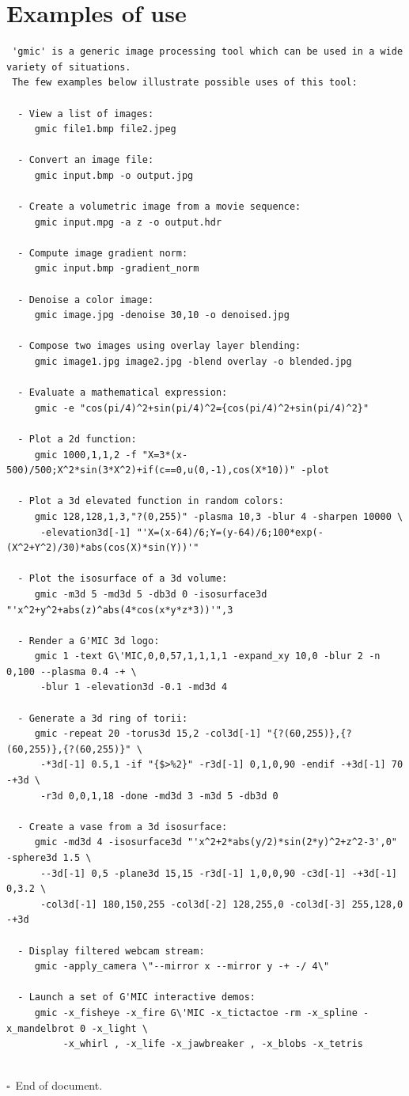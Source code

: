 \documentclass[a4paper,11pt,twoside]{book}
\begin{document}
\section{Examples of use}
\small
\begin{lstlisting}
 'gmic' is a generic image processing tool which can be used in a wide variety of situations. 
 The few examples below illustrate possible uses of this tool: 
 
  - View a list of images: 
     gmic file1.bmp file2.jpeg 
 
  - Convert an image file: 
     gmic input.bmp -o output.jpg 
 
  - Create a volumetric image from a movie sequence: 
     gmic input.mpg -a z -o output.hdr 
 
  - Compute image gradient norm: 
     gmic input.bmp -gradient_norm 
 
  - Denoise a color image: 
     gmic image.jpg -denoise 30,10 -o denoised.jpg 
 
  - Compose two images using overlay layer blending: 
     gmic image1.jpg image2.jpg -blend overlay -o blended.jpg 
 
  - Evaluate a mathematical expression: 
     gmic -e "cos(pi/4)^2+sin(pi/4)^2={cos(pi/4)^2+sin(pi/4)^2}" 
 
  - Plot a 2d function: 
     gmic 1000,1,1,2 -f "X=3*(x-500)/500;X^2*sin(3*X^2)+if(c==0,u(0,-1),cos(X*10))" -plot 
 
  - Plot a 3d elevated function in random colors: 
     gmic 128,128,1,3,"?(0,255)" -plasma 10,3 -blur 4 -sharpen 10000 \ 
      -elevation3d[-1] "'X=(x-64)/6;Y=(y-64)/6;100*exp(-(X^2+Y^2)/30)*abs(cos(X)*sin(Y))'" 
 
  - Plot the isosurface of a 3d volume: 
     gmic -m3d 5 -md3d 5 -db3d 0 -isosurface3d "'x^2+y^2+abs(z)^abs(4*cos(x*y*z*3))'",3 
 
  - Render a G'MIC 3d logo: 
     gmic 1 -text G\'MIC,0,0,57,1,1,1,1 -expand_xy 10,0 -blur 2 -n 0,100 --plasma 0.4 -+ \ 
      -blur 1 -elevation3d -0.1 -md3d 4 
 
  - Generate a 3d ring of torii: 
     gmic -repeat 20 -torus3d 15,2 -col3d[-1] "{?(60,255)},{?(60,255)},{?(60,255)}" \ 
      -*3d[-1] 0.5,1 -if "{$>%2}" -r3d[-1] 0,1,0,90 -endif -+3d[-1] 70 -+3d \ 
      -r3d 0,0,1,18 -done -md3d 3 -m3d 5 -db3d 0 
 
  - Create a vase from a 3d isosurface: 
     gmic -md3d 4 -isosurface3d "'x^2+2*abs(y/2)*sin(2*y)^2+z^2-3',0" -sphere3d 1.5 \ 
      --3d[-1] 0,5 -plane3d 15,15 -r3d[-1] 1,0,0,90 -c3d[-1] -+3d[-1] 0,3.2 \ 
      -col3d[-1] 180,150,255 -col3d[-2] 128,255,0 -col3d[-3] 255,128,0 -+3d 
 
  - Display filtered webcam stream: 
     gmic -apply_camera \"--mirror x --mirror y -+ -/ 4\" 
 
  - Launch a set of G'MIC interactive demos: 
     gmic -x_fisheye -x_fire G\'MIC -x_tictactoe -rm -x_spline -x_mandelbrot 0 -x_light \ 
          -x_whirl , -x_life -x_jawbreaker , -x_blobs -x_tetris 

\end{lstlisting}
\normalsize
 
\printindex 
~\\$\square$~End of document. 
\end{document}
